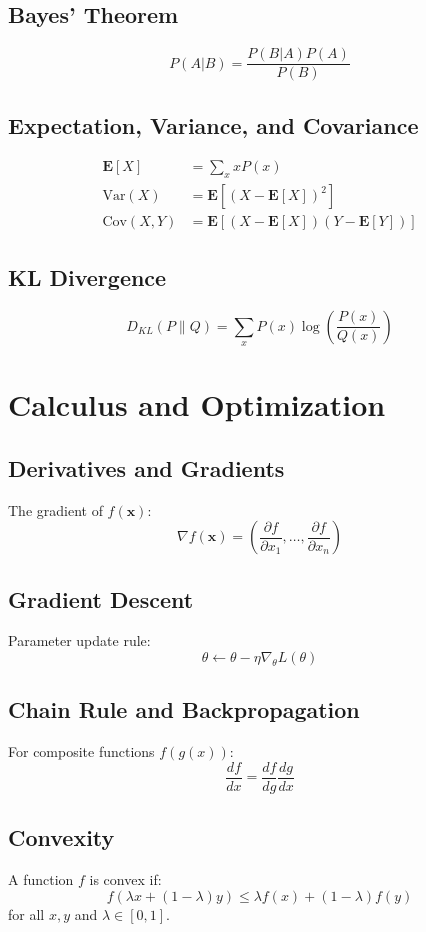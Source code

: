 \documentclass[openany]{book}
\begin{document}
\subsection{Bayes' Theorem}
\[
P(A|B) = \frac{P(B|A)P(A)}{P(B)}
\]

\subsection{Expectation, Variance, and Covariance}
\begin{align*}
\mathbf{E}[X] &= \sum_x xP(x) \\
\text{Var}(X) &= \mathbf{E}[(X-\mathbf{E}[X])^2] \\
\text{Cov}(X,Y) &= \mathbf{E}[(X-\mathbf{E}[X])(Y-\mathbf{E}[Y])]
\end{align*}

\subsection{KL Divergence}
\[
D_{KL}(P \| Q) = \sum_x P(x)\log\left(\frac{P(x)}{Q(x)}\right)
\]

\section{Calculus and Optimization}

\subsection{Derivatives and Gradients}
The gradient of $f(\mathbf{x})$:
\[
\nabla f(\mathbf{x}) = \left(\frac{\partial f}{\partial x_1}, \ldots, 
\frac{\partial f}{\partial x_n}\right)
\]

\subsection{Gradient Descent}
Parameter update rule:
\[
\theta \leftarrow \theta - \eta \nabla_\theta L(\theta)
\]

\subsection{Chain Rule and Backpropagation}
For composite functions $f(g(x))$:
\[
\frac{df}{dx} = \frac{df}{dg}\frac{dg}{dx}
\]

\subsection{Convexity}
A function $f$ is convex if:
\[
f(\lambda x + (1-\lambda)y) \leq \lambda f(x) + (1-\lambda)f(y)
\]
for all $x,y$ and $\lambda \in [0,1]$.
\end{document}
